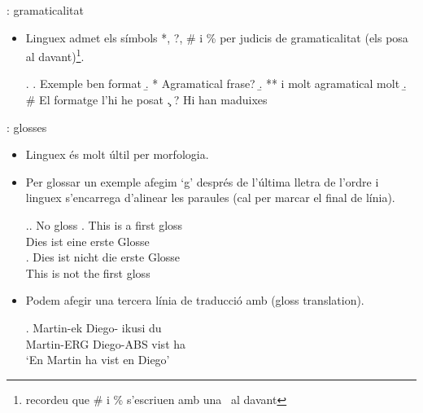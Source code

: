 \begin{frame}[fragile]{\insertsubsection{}: gramaticalitat}
\begin{itemize}
    \item Linguex admet els símbols *, ?, \# i \% per judicis de gramaticalitat (els posa al davant)\footnote{recordeu que \# i \% s'escriuen amb una \bs~al davant}.
\begin{exampletwouptiny2}
\ex. 
\a. Exemple ben format 
\b. * Agramatical frase? 
\b. ** i molt agramatical molt
\b. \# El formatge l'hi he posat 
\c. ? Hi han maduixes 

\end{exampletwouptiny2}
\end{itemize}

\end{frame}

\begin{frame}[fragile]{\insertsubsection{}: glosses}
\begin{itemize}
\item Linguex és molt últil per morfologia. 
\item Per glossar un exemple afegim `g' després de l'última lletra de l'ordre i linguex s'encarrega d'alinear les paraules (cal \keystrokebftt{\bs\bs}  per marcar el final de línia).
\begin{exampletwouptiny2}
\ex.\a. No gloss
\bg. This is a first gloss\\
Dies ist eine erste Glosse\\

\exg.
Dies ist nicht die erste Glosse\\
This is not the first gloss\\

\end{exampletwouptiny2}
\item Podem afegir una tercera línia de traducció amb  (gloss translation).
\begin{exampletwouptiny2}
\exg. 
Martin-ek Diego-\zero{} ikusi du \\
Martin-ERG Diego-ABS vist ha \\
\glt `En Martin ha vist en Diego'

\end{exampletwouptiny2}
\end{itemize}

\end{frame}

